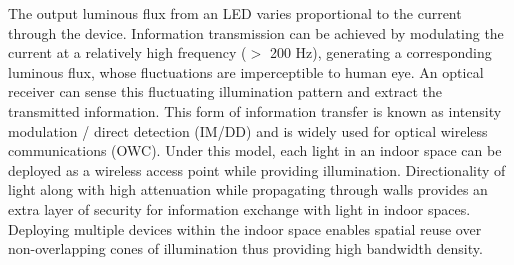 The output luminous flux from an LED varies proportional to the current through the device. Information transmission can be achieved by modulating the current at a relatively high frequency ($>$ 200 Hz), generating a corresponding luminous flux, whose fluctuations are imperceptible to human eye. An optical receiver can sense this fluctuating illumination pattern and extract the transmitted information. This form of information transfer is known as intensity modulation / direct detection (IM/DD) and is widely used for optical wireless communications (OWC). Under this model, each light in an indoor space can be deployed as a wireless access point while providing illumination. Directionality of light along with high attenuation while propagating through walls provides an extra layer of security for information exchange with light in indoor spaces. Deploying multiple devices within the indoor space enables spatial reuse over non-overlapping cones of illumination thus providing high bandwidth density.
